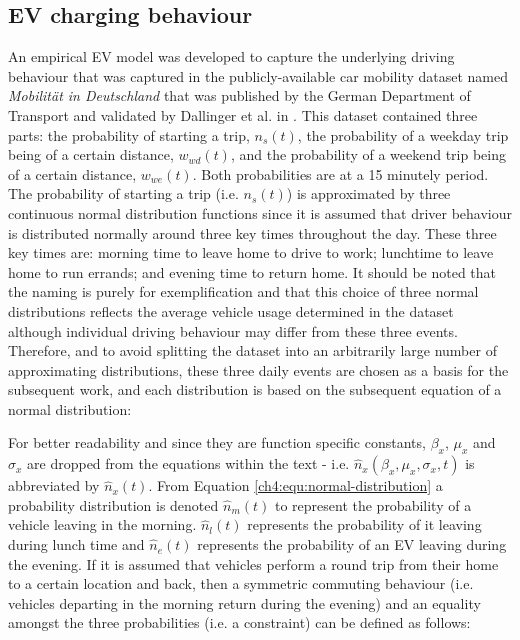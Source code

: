 \subsection{EV charging behaviour}
\label{ch4:subsec:ev-charging-behaviour}


An empirical EV model was developed to capture the underlying driving behaviour that was captured in the publicly-available car mobility dataset named \textit{Mobilit\"{a}t in Deutschland} that was published by the German Department of Transport \cite{MiD2008} and validated by Dallinger et al. in \cite{Dallinger2012}.
This dataset contained three parts: the probability of starting a trip, $n_{s}(t)$, the probability of a weekday trip being of a certain distance, $w_{wd}(t)$, and the probability of a weekend trip being of a certain distance, $w_{we}(t)$.
Both probabilities are at a 15 minutely period.
The probability of starting a trip (i.e. $n_{s}(t)$) is approximated by three continuous normal distribution functions since it is assumed that driver behaviour is distributed normally around three key times throughout the day.
These three key times are: morning time to leave home to drive to work; lunchtime to leave home to run errands; and evening time to return home.
It should be noted that the naming is purely for exemplification and that this choice of three normal distributions reflects the average vehicle usage determined in the dataset \cite{MiD2008} although individual driving behaviour may differ from these three events.
Therefore, and to avoid splitting the dataset into an arbitrarily large number of approximating distributions, these three daily events are chosen as a basis for the subsequent work, and each distribution is based on the subsequent equation of a normal distribution:



For better readability and since they are function specific constants, $\beta_x$, $\mu_x$ and $\sigma_x$ are dropped from the equations within the text - i.e. $\hat{n}_x(\beta_x,\mu_x,\sigma_x,t)$ is abbreviated by $\hat{n}_x(t)$.
From Equation \ref{ch4:equ:normal-distribution} a probability distribution is denoted $\hat{n}_{m}(t)$ to represent the probability of a vehicle leaving in the morning.
$\hat{n}_{l}(t)$ represents the probability of it leaving during lunch time and $\hat{n}_{e}(t)$ represents the probability of an EV leaving during the evening.
If it is assumed that vehicles perform a round trip from their home to a certain location and back, then a symmetric commuting behaviour (i.e. vehicles departing in the morning return during the evening) and an equality amongst the three probabilities (i.e. a constraint) can be defined as follows:

